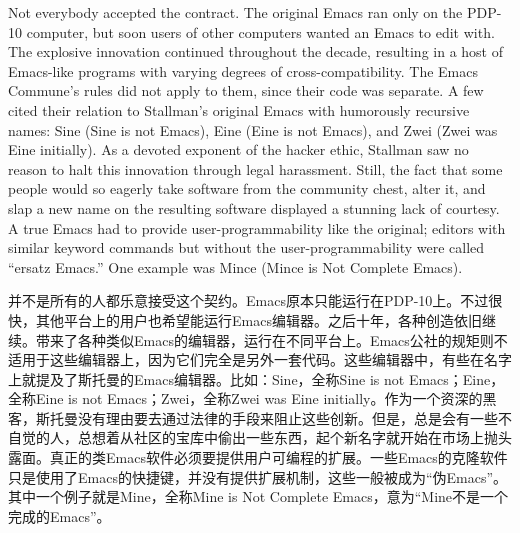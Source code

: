 \ifdefined\eng
\ifdefined\vone Not everybody accepted the contract. \fi\ifdefined\vtwo The original Emacs ran only on the PDP-10 computer, but soon users of other computers wanted an Emacs to edit with. \fi The explosive innovation continued throughout the decade, resulting in a host of Emacs-like programs with varying degrees of cross-compatibility. \ifdefined\vtwo The Emacs Commune's rules did not apply to them, since their code was separate. \fi A few cited their relation to Stallman's original Emacs with humorously recursive names: Sine (Sine is not Emacs), Eine (Eine is not Emacs), and Zwei (Zwei was Eine initially). \ifdefined\vone As a devoted exponent of the hacker ethic, Stallman saw no reason to halt this innovation through legal harassment. Still, the fact that some people would so eagerly take software from the community chest, alter it, and slap a new name on the resulting software displayed a stunning lack of courtesy. \fi\ifdefined\vtwo A true Emacs had to provide user-programmability like the original; editors with similar keyword commands but without the user-programmability were called ``ersatz Emacs.''  One example was Mince (Mince is Not Complete Emacs). \fi
\fi

\ifdefined\chs
\ifdefined\vone 并不是所有的人都乐意接受这个契约。\fi\ifdefined\vtwo Emacs原本只能运行在PDP-10上。不过很快，其他平台上的用户也希望能运行Emacs编辑器。\fi 之后十年，各种创造依旧继续。带来了各种类似Emacs的编辑器，运行在不同平台上。\ifdefined\vtwo Emacs公社的规矩则不适用于这些编辑器上，因为它们完全是另外一套代码。\fi 这些编辑器中，有些在名字上就提及了斯托曼的Emacs编辑器。比如：Sine，全称Sine is not Emacs；Eine，全称Eine is not Emacs；Zwei，全称Zwei was Eine initially。\ifdefined\vone 作为一个资深的黑客，斯托曼没有理由要去通过法律的手段来阻止这些创新。但是，总是会有一些不自觉的人，总想着从社区的宝库中偷出一些东西，起个新名字就开始在市场上抛头露面。\fi\ifdefined\vtwo 真正的类Emacs软件必须要提供用户可编程的扩展。一些Emacs的克隆软件只是使用了Emacs的快捷键，并没有提供扩展机制，这些一般被成为``伪Emacs''。其中一个例子就是Mine，全称Mine is Not Complete Emacs，意为``Mine不是一个完成的Emacs''。\fi
\fi

